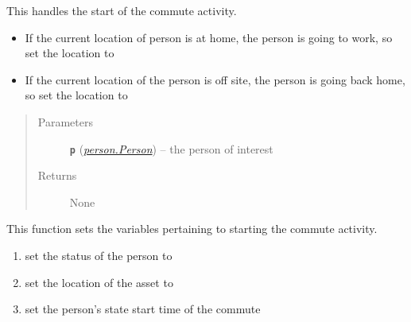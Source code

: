 \documentclass[letterpaper,10pt,english]{sphinxmanual}
\begin{document}
\begin{fulllineitems}
\begin{fulllineitems}
\begin{quote}
\begin{description}
\end{description}\end{quote}

\end{fulllineitems}


\begin{fulllineitems}
\label{commute:commute.Commute.start}
This handles the start of the commute activity.
\begin{itemize}
\item {} 
If the current location of person is at home, the person is going to work, so set the         location to 

\item {} 
If the current location of the person is off site, the person is going back home, so         set the location to 

\end{itemize}
\begin{quote}\begin{description}
\item[{Parameters}] \leavevmode
\textbf{\texttt{p}} ({\hyperref[person:person.Person]{\emph{\emph{person.Person}}}}) -- the person of interest

\item[{Returns}] \leavevmode
None

\end{description}\end{quote}

\end{fulllineitems}


\begin{fulllineitems}
\label{commute:commute.Commute.start_commute}
This function sets the variables pertaining to starting the commute activity.
\begin{enumerate}
\item {} 
set the status of the person to 

\item {} 
set the location of the asset to 

\item {} 
set the person's state start time of the commute


\end{enumerate}
\end{fulllineitems}
\end{fulllineitems}
\end{document}
